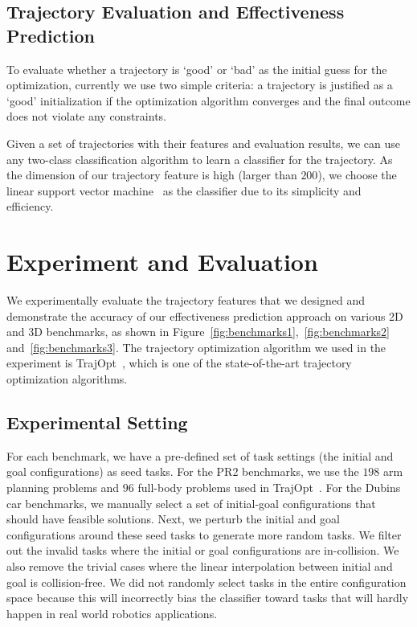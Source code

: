 \documentclass[letterpaper, 10 pt, conference]{ieeeconf}  %
\begin{document}
\subsection{Trajectory Evaluation and Effectiveness Prediction}
To evaluate whether a trajectory is `good' or `bad' as the initial guess for the optimization, currently we use two simple criteria: a trajectory is justified as a `good' initialization if the optimization algorithm converges and the final outcome does not violate any constraints. 

Given a set of trajectories with their features and evaluation results, we can use any two-class classification algorithm to learn a classifier for the trajectory. As the dimension of our trajectory feature is high (larger than $200$), we choose the linear support vector machine~\cite{Cortes:1995:SN} as the classifier due to its simplicity and efficiency.

\section{Experiment and Evaluation}
\label{sec:experiment}
We experimentally evaluate the trajectory features that we designed and demonstrate the accuracy of our effectiveness prediction approach on various 2D and 3D benchmarks, as shown in Figure~\ref{fig:benchmarks1},~\ref{fig:benchmarks2} and~\ref{fig:benchmarks3}. The trajectory optimization algorithm we used in the experiment is TrajOpt~\cite{Schulman:2013:FLO}, which is one of the state-of-the-art trajectory optimization algorithms.

\subsection{Experimental Setting}

For each benchmark, we have a pre-defined set of task settings (the initial and goal configurations) as seed tasks. For the PR2 benchmarks, we use the $198$ arm planning problems and $96$ full-body problems used in TrajOpt~\cite{Schulman:2013:FLO}. For the Dubins car benchmarks, we manually select a set of initial-goal configurations that should have feasible solutions. Next, we perturb the initial and goal configurations around these seed tasks to generate more random tasks. We filter out the invalid tasks where the initial or goal configurations are in-collision. We also remove the trivial cases where the linear interpolation between initial and goal is collision-free. We did not randomly select tasks in the entire configuration space because this will incorrectly bias the classifier toward tasks that will hardly happen in real world robotics applications.
\end{document}
